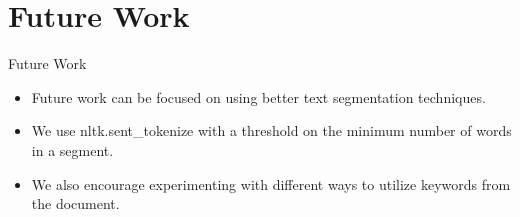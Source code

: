 \section{Future Work}

\begin{frame}{Future Work}

  \begin{itemize}
    \item Future work can be focused on using better text segmentation techniques.
    \item We use nltk.sent\_tokenize with a threshold on the minimum number of words in a segment.
    \item We also encourage experimenting with different ways to utilize keywords from the document.
  \end{itemize}

\end{frame}
